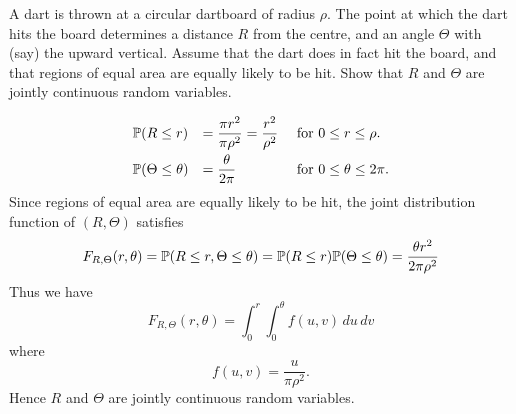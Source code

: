 \begin{example}
A dart is thrown at a circular dartboard of radius $\rho$. The point at which the dart hits the board determines a distance $R$ from the centre, and an angle $\Theta$ with (say) the upward vertical. Assume that the dart does in fact hit the board, and that regions of equal area are equally likely to be hit. Show that $R$ and $\Theta$ are jointly continuous random variables.
\end{example}
\begin{solution}
\[
\begin{array}{lll}
\mathbb{P}(R\leq r) 			& = \displaystyle \frac{\pi r^2}{\pi\rho^2} = \frac{r^2}{\rho^2} 
						& \text{ for } 0\leq r\leq \rho. \\[2ex]
\mathbb{P}(\Theta\leq \theta)	& = \displaystyle \frac{\theta}{2\pi} 									
						& \text{ for } 0\leq \theta\leq 2\pi.
\end{array}
\]
Since regions of equal area are equally likely to be hit, the joint distribution function of $(R,\Theta)$ satisfies
\[
F_{R,\Theta}(r,\theta) = \mathbb{P}(R\leq r,\Theta\leq\theta) = \mathbb{P}(R\leq r)\mathbb{P}(\Theta\leq\theta) = \frac{\theta r^2}{2\pi\rho^2}
\]
Thus we have
\[
F_{R,\Theta}(r,\theta) = \int_0^r\int_0^\theta f(u,v)\,du\,dv
\]
where
\[
f(u,v) =\frac{u}{\pi\rho^2}.
\]
Hence $R$ and $\Theta$ are jointly continuous random variables.
\end{solution}




%
%
%

